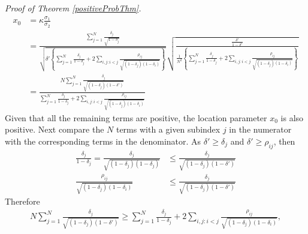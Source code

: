 \documentclass[11pt]{article}
\theoremstyle{definition}
\theoremstyle{definition}
\begin{document}
\textit{Proof of Theorem \ref{positiveProbThm}.}
\begin{align*}
x_0 &= \kappa \frac{\sigma_1}{\sigma_2} \\
 &= \frac{ \sum_{j=1}^N \frac{\delta_j}{\sqrt{1-\delta_j}}}{\sqrt{\delta'  \left\{ \sum_{j=1}^N \frac{\delta_j}{1-\delta_j} + 2 \sum_{i,j: i<j} \frac{\rho_{ij}}{\sqrt{(1-\delta_j)(1-\delta_i)}}\right\}}} \sqrt{\frac{\frac{\delta'}{1-\delta'}}{\frac{1}{N^2} \left\{ \sum_{j=1}^N \frac{\delta_j}{1-\delta_j} + 2 \sum_{i,j: i<j} \frac{\rho_{ij}}{\sqrt{(1-\delta_j)(1-\delta_i)}}\right\} }}\\
&=  \frac{N \sum_{j=1}^N \frac{\delta_j}{\sqrt{(1-\delta_j)(1-\delta')}}}{ \sum_{j=1}^N \frac{\delta_j}{1-\delta_j} + 2 \sum_{i,j: i<j} \frac{\rho_{ij}}{\sqrt{(1-\delta_j)(1-\delta_i)}}}
\end{align*}
Given that all the remaining terms are positive, the location parameter $x_0$ is also positive. Next compare the $N$ terms with a given subindex $j$ in the numerator with the corresponding terms in the denominator. As $\delta' \geq \delta_j$ and $\delta' \geq \rho_{ij}$, then 
\begin{align}
\frac{\delta_j}{1-\delta_j} = \frac{\delta_j}{\sqrt{(1-\delta_j)(1-\delta_j)}} &\leq \frac{\delta_j}{\sqrt{(1-\delta_j)(1-\delta')}} \label{ProofIneq1}\\
 \frac{\rho_{ij}}{\sqrt{(1-\delta_j)(1-\delta_i)}} &\leq \frac{\delta_j}{\sqrt{(1-\delta_j)(1-\delta')}} \label{ProofIneq2}
\end{align}
Therefore 
\begin{align*}
N \sum_{j=1}^N \frac{\delta_j}{\sqrt{(1-\delta_j)(1-\delta')}} \geq \sum_{j=1}^N \frac{\delta_j}{1-\delta_j} + 2 \sum_{i,j: i<j} \frac{\rho_{ij}}{\sqrt{(1-\delta_j)(1-\delta_i)}},
\end{align*}
\end{document}

